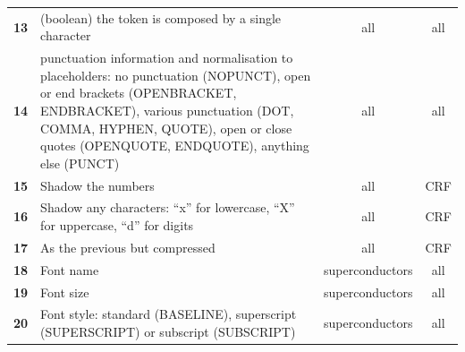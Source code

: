 \begin{table}
\begin{tabular}{l m{30em} c c}
        \textbf{13}   & (boolean) the token is composed by a single character                                                                                                                                                                                                    & all             & all                   \\
        \textbf{14}   & punctuation information and normalisation to placeholders: no punctuation (NOPUNCT), open or end brackets (OPENBRACKET, ENDBRACKET), various punctuation (DOT, COMMA, HYPHEN, QUOTE), open or close quotes (OPENQUOTE, ENDQUOTE), anything else (PUNCT) & all             & all                   \\
        \textbf{15}   & Shadow the numbers                                                                                                                                                                                                                                       & all             & CRF                   \\
        \textbf{16}   & Shadow any characters: ``x'' for lowercase, ``X'' for uppercase, ``d'' for digits                                                                                                                                                                        & all             & CRF                   \\
        \textbf{17}   & As the previous but compressed                                                                                                                                                                                                                           & all             & CRF                   \\
        \textbf{18}   & Font name                                                                                                                                                                                                                                                & superconductors & all                   \\
        \textbf{19}   & Font size                                                                                                                                                                                                                                                & superconductors & all                   \\
        \textbf{20}   & Font style: standard (BASELINE), superscript (SUPERSCRIPT) or subscript (SUBSCRIPT)   & superconductors & all                   \\

\end{tabular}
\end{table}
